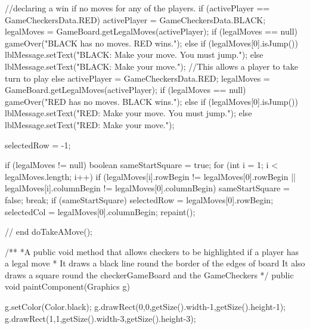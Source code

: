 \documentclass[10pt, a4paper]{article}
\begin{document}
{{{         //declaring a win if no moves for any of the players.
         if (activePlayer == GameCheckersData.RED) {
            activePlayer = GameCheckersData.BLACK;
            legalMoves = GameBoard.getLegalMoves(activePlayer);
            if (legalMoves == null)
               gameOver("BLACK has no moves.  RED wins.");
            else if (legalMoves[0].isJump())
               lblMessage.setText("BLACK:  Make your move.  You must jump.");
            else
               lblMessage.setText("BLACK:  Make your move.");
         }
		 //This allows a player to take turn to play
         else {
            activePlayer = GameCheckersData.RED;
            legalMoves = GameBoard.getLegalMoves(activePlayer);
            if (legalMoves == null)
               gameOver("RED has no moves.  BLACK wins.");
            else if (legalMoves[0].isJump())
               lblMessage.setText("RED:  Make your move.  You must jump.");
            else
               lblMessage.setText("RED:  Make your move.");
         }

         selectedRow = -1;

         if (legalMoves != null) {
            boolean sameStartSquare = true;
            for (int i = 1; i < legalMoves.length; i++)
               if (legalMoves[i].rowBegin != legalMoves[0].rowBegin
                     || legalMoves[i].columnBegin != legalMoves[0].columnBegin) {
                  sameStartSquare = false;
                  break;
               }
            if (sameStartSquare) {
               selectedRow = legalMoves[0].rowBegin;
               selectedCol = legalMoves[0].columnBegin;
            }
         }
         repaint();
      }  // end doTakeAMove();

      /**
	  *A public void method that allows checkers to be highlighted if a player has a legal move
       * It draws a black line round the border of the edges of board
	   It also draws a square round the checkerGameBoard and the GameCheckers
       */
      public void paintComponent(Graphics g) {
         g.setColor(Color.black);
         g.drawRect(0,0,getSize().width-1,getSize().height-1);
         g.drawRect(1,1,getSize().width-3,getSize().height-3);

}}}
\end{document}
